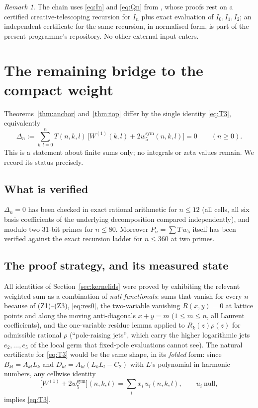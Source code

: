 \documentclass[11pt]{article}
\theoremstyle{remark}
\newtheorem{remark}{Remark}
\begin{document}
\begin{remark}
The chain uses \eqref{eq:In} and \eqref{eq:Qn} from \cite{BZ}, whose proofs
rest on a certified creative-telescoping recursion for $I_n$ plus exact
evaluation of $I_0,I_1,I_2$; an independent certificate for the same
recursion, in normalised form, is part of the present programme's
repository.  No other external input enters.
\end{remark}

\section{The remaining bridge to the compact weight}\label{sec:T3}

Theorems~\ref{thm:anchor} and~\ref{thm:top} differ by the single identity
\eqref{eq:T3}, equivalently
\[
 \Delta_n:=\sum_{k,l=0}^nT(n,k,l)\,
 \bigl[W^{(1)}(k,l)+2w_5^{\mathrm{sym}}(n,k,l)\bigr]=0
 \qquad(n\ge0).
\]
This is a statement about finite sums only; no integrals or zeta values
remain.  We record its status precisely.

\subsection{What is verified}
$\Delta_n=0$ has been checked in exact rational arithmetic for $n\le12$
(all cells, all six basis coefficients of the underlying decomposition
compared independently), and modulo two 31-bit primes for $n\le80$.
Moreover $P_n=\sum T\,w_5$ itself has been verified against the exact
recursion ladder for $n\le360$ at two primes.

\subsection{The proof strategy, and its measured state}
All identities of Section~\ref{sec:kernelids} were proved by exhibiting the
relevant weighted sum as a combination of \emph{null functionals}: sums
that vanish for every $n$ because of (Z1)--(Z3), \eqref{eq:res0}, the
two-variable vanishing $R(x,y)=0$ at lattice points and along the moving
anti-diagonals $x+y=m$ ($1\le m\le n$, all Laurent coefficients), and the
one-variable residue lemma applied to $R_k(z)\rho(z)$ for admissible
rational $\rho$ (``pole-raising jets'', which carry the higher logarithmic
jets $e_2,\dots,e_5$ of the local germ that fixed-pole evaluations cannot
see).  The natural certificate for \eqref{eq:T3} would be the same shape,
in its \emph{folded} form: since $B_{kl}=A_{kl}L_k$ and
$D_{kl}=A_{kl}(L_kL_l-C_2)$ with $L$'s polynomial in harmonic numbers, any
cellwise identity
\[
 \bigl[W^{(1)}+2w_5^{\mathrm{sym}}\bigr](n,k,l)
 =\sum_i x_i\,u_i(n,k,l),
 \qquad u_i\ \text{null},
\]
implies \eqref{eq:T3}.
\end{document}
